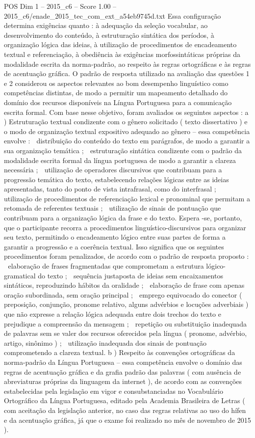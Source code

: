 \begin{textsample}{POS Dim 1 – 2015\_c6 – Score 1.00 – 2015\_c6/enade\_2015\_tec\_com\_ext\_a54eb9745d.txt}
Essa configuração determina exigências quanto : à adequação da seleção vocabular, ao desenvolvimento do conteúdo, à estruturação sintática dos períodos, à organização lógica das ideias, à utilização de procedimentos de encadeamento textual e referenciação, à obediência às exigências morfossintáticas próprias da modalidade escrita da norma-padrão, ao respeito às regras ortográficas e às regras de acentuação gráfica.
O padrão de resposta utilizado na avaliação das questões 1 e 2 considerou os aspectos relevantes ao bom desempenho linguístico como competências distintas, de modo a permitir um mapeamento detalhado do domínio dos recursos disponíveis na Língua Portuguesa para a comunicação escrita formal.
Com base nesse objetivo, foram avaliados os seguintes aspectos : a ) Estruturação textual condizente com o gênero solicitado ( texto dissertativo ) e o modo de organização textual expositivo adequado ao gênero – essa competência envolve :  distribuição do conteúdo do texto em parágrafos, de modo a garantir a sua organização temática ;  estruturação sintática condizente com o padrão da modalidade escrita formal da língua portuguesa de modo a garantir a clareza necessária ;  utilização de operadores discursivos que contribuam para a progressão temática do texto, estabelecendo relações lógicas entre as ideias apresentadas, tanto do ponto de vista intrafrasal, como do interfrasal ;  utilização de procedimentos de referenciação lexical e pronominal que permitam a retomada de referentes textuais ;  utilização de sinais de pontuação que contribuam para a organização lógica da frase e do texto.
Espera -se, portanto, que o participante recorra a procedimentos linguístico-discursivos para organizar seu texto, permitindo o encadeamento lógico entre suas partes de forma a garantir a progressão e a coerência textual.
Isso significa que os seguintes procedimentos foram penalizados, de acordo com o padrão de resposta proposto :  elaboração de frases fragmentadas que comprometam a estrutura lógico-gramatical do texto ;  sequência justaposta de ideias sem encaixamentos sintáticos, reproduzindo hábitos da oralidade ;  elaboração de frase com apenas oração subordinada, sem oração principal ;  emprego equivocado do conector ( preposição, conjunção, pronome relativo, alguns advérbios e locuções adverbiais ) que não expresse a relação lógica adequada entre dois trechos do texto e prejudique a compreensão da mensagem ;  repetição ou substituição inadequada de palavras sem se valer dos recursos oferecidos pela língua ( pronome, advérbio, artigo, sinônimo ) ;  utilização inadequada dos sinais de pontuação comprometendo a clareza textual. b ) Respeito às convenções ortográficas da norma-padrão da Língua Portuguesa – essa competência envolve o domínio das regras de acentuação gráfica e da grafia padrão das palavras ( com ausência de abreviaturas próprias da linguagem da internet ), de acordo com as convenções estabelecidas pela legislação em vigor e consubstanciadas no Vocabulário Ortográfico da Língua Portuguesa, editado pela Academia Brasileira de Letras ( com aceitação da legislação anterior, no caso das regras relativas ao uso do hífen e da acentuação gráfica, já que o exame foi realizado no mês de novembro de 2015 ).

\end{textsample}
